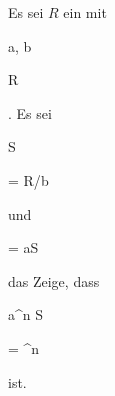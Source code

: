 {


Es sei $R$ ein
mit


\mavergleichskette


{\vergleichskette


{ {\mathfrak a}, {\mathfrak b}
}


{ \subseteq }{ R
}


{  }{
}


{    }{
}


{   }{
}


}
{}{}{.}
Es sei


\mavergleichskette


{\vergleichskette


{ S
}


{ = }{ R/{\mathfrak b}
}


{  }{
}


{    }{
}


{   }{
}


}
{}{}{}
und


\mavergleichskette


{\vergleichskette


{ 
}


{ = }{ {\mathfrak a}S
}


{  }{
}


{    }{
}


{   }{
}


}
{}{}{}
das
Zeige, dass


\mavergleichskette


{\vergleichskette


{ {\mathfrak a}^n S
}


{ = }{ ^n
}


{  }{
}


{    }{
}


{   }{
}


}
{}{}{}
ist.


}


{} {}




{}


